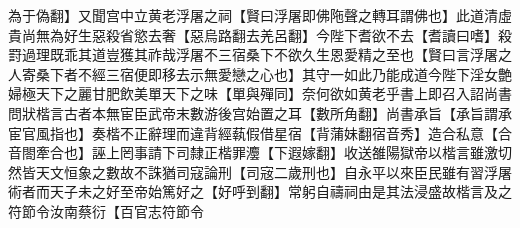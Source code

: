 為于偽翻】又聞宫中立黄老浮屠之祠【賢曰浮屠即佛陁聲之轉耳謂佛也】此道清虛貴尚無為好生惡殺省慾去奢【惡烏路翻去羌呂翻】今陛下耆欲不去【耆讀曰嗜】殺罸過理既乖其道豈獲其祚哉浮屠不三宿桑下不欲久生恩愛精之至也【賢曰言浮屠之人寄桑下者不經三宿便即移去示無愛戀之心也】其守一如此乃能成道今陛下淫女艶婦極天下之麗甘肥飲美單天下之味【單與殫同】奈何欲如黄老乎書上即召入詔尚書問狀楷言古者本無宦臣武帝末數游後宫始置之耳【數所角翻】尚書承旨【承旨謂承宦官風指也】奏楷不正辭理而違背經蓻假借星宿【背蒲妹翻宿音秀】造合私意【合音閤牽合也】誣上罔事請下司隸正楷罪灋【下遐嫁翻】收送雒陽獄帝以楷言雖激切然皆天文恒象之數故不誅猶司寇論刑【司宼二歲刑也】自永平以來臣民雖有習浮屠術者而天子未之好至帝始篤好之【好呼到翻】常躬自禱祠由是其法浸盛故楷言及之符節令汝南蔡衍【百官志符節令